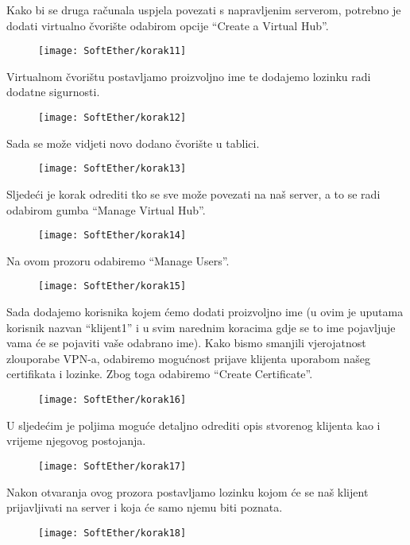 \FloatBarrier
Kako bi se druga računala uspjela povezati s napravljenim serverom, potrebno je dodati virtualno čvorište odabirom opcije ``Create a Virtual Hub''.
\begin{figure}[h!]
     \centering
     \texttt{[image: SoftEther/korak11]}
\end{figure}
\FloatBarrier
Virtualnom čvorištu postavljamo proizvoljno ime te dodajemo lozinku radi dodatne sigurnosti.
\begin{figure}[h!]
     \centering
     \texttt{[image: SoftEther/korak12]}
\end{figure}
\FloatBarrier
Sada se može vidjeti novo dodano čvorište u tablici.
\begin{figure}[h!]
     \centering
     \texttt{[image: SoftEther/korak13]}
\end{figure}
\FloatBarrier
Sljedeći je korak odrediti tko se sve može povezati na naš server, a to se radi odabirom gumba ``Manage Virtual Hub''.
\begin{figure}[h!]
     \centering
     \texttt{[image: SoftEther/korak14]}
\end{figure}
\FloatBarrier
Na ovom prozoru odabiremo ``Manage Users''.
\begin{figure}[h!]
     \centering
     \texttt{[image: SoftEther/korak15]}
\end{figure}
\FloatBarrier
Sada dodajemo korisnika kojem ćemo dodati proizvoljno ime (u ovim je uputama korisnik nazvan ``klijent1'' i u svim narednim koracima gdje se to ime pojavljuje vama će se pojaviti vaše odabrano ime). Kako bismo smanjili vjerojatnost zlouporabe VPN-a, odabiremo mogućnost prijave klijenta uporabom našeg certifikata i lozinke. Zbog toga odabiremo ``Create Certificate''.
\begin{figure}[h!]
     \centering
     \texttt{[image: SoftEther/korak16]}
\end{figure}
\FloatBarrier
U sljedećim je poljima moguće detaljno odrediti opis stvorenog klijenta kao i vrijeme njegovog postojanja.
\begin{figure}[h!]
     \centering
     \texttt{[image: SoftEther/korak17]}
\end{figure}
\FloatBarrier
Nakon otvaranja ovog prozora postavljamo lozinku kojom će se naš klijent prijavljivati na server i koja će samo njemu biti poznata.
\begin{figure}[h!]
     \centering
     \texttt{[image: SoftEther/korak18]}
\end{figure}
